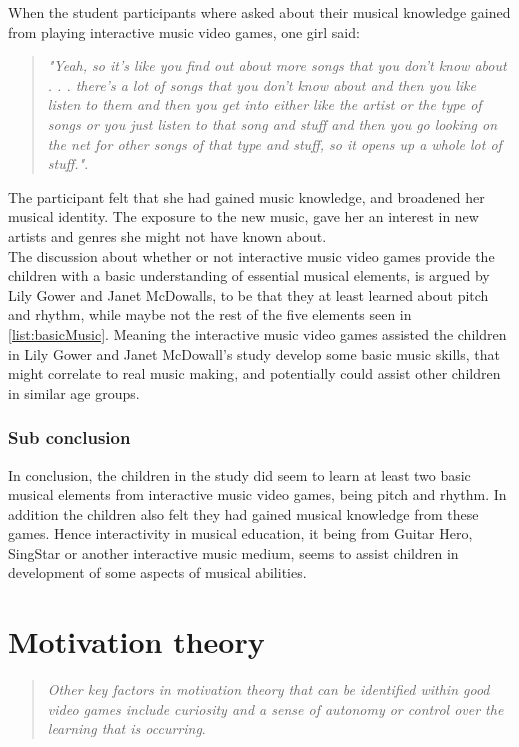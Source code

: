When the student participants where asked about their musical knowledge gained from playing interactive music video games, one girl said:
\begin{quote}
	\textit{"Yeah, so it’s like you find out about more songs that you don’t know about . . . there’s a lot of songs that you don’t know about and then you like listen to them and then you get into either like the artist or the type of songs or you just listen to that song and stuff and then you go looking on the net for other songs of that type and stuff, so it opens up a whole lot of stuff."}\cite[p.~100]{interactiveMusicVideoGames}.\\
\end{quote}	
The participant felt that she had gained music knowledge, and broadened her musical identity. The exposure to the new music, gave her an interest in new artists and genres she might not have known about.\\

The discussion about whether or not interactive music video games provide the children with a basic understanding of essential musical elements, is argued by Lily Gower and Janet McDowalls, to be that they at least learned about pitch and rhythm, while maybe not the rest of the five elements seen in \autoref{list:basicMusic}. Meaning the interactive music video games assisted the children in Lily Gower and Janet McDowall's study develop some basic music skills, that might correlate to real music making\cite[p.~99]{interactiveMusicVideoGames}, and potentially could assist other children in similar age groups.

\subsubsection*{Sub conclusion}
In conclusion, the children in the study\cite{interactiveMusicVideoGames} did seem to learn at least two basic musical elements from interactive music video games, being pitch and rhythm. In addition the children also felt they had gained musical knowledge from these games. Hence interactivity in musical education, it being from Guitar Hero, SingStar or another interactive music medium, seems to assist children in development of some aspects of musical abilities.

\section{Motivation theory}
\begin{quote}
	\textit{Other key factors in motivation theory that can be identified within good video games include curiosity and a sense of autonomy or control over the learning that is occurring}\cite[p.~92]{interactiveMusicVideoGames}.\\
\end{quote}

